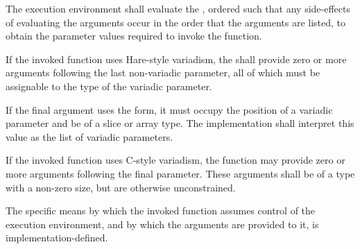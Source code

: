 \specsubsubitem
The execution environment shall evaluate the ,
ordered such that any side-effects of evaluating the arguments occur in the
order that the arguments are listed, to obtain the parameter values required to
invoke the function.

\specsubsubitem
If the invoked function uses Hare-style variadism, the
 shall provide zero or more arguments following the
last non-variadic parameter, all of which must be assignable to the type of the
variadic parameter.

\specsubsubitem
If the final argument uses the  form, it must occupy the position of a
variadic parameter and be of a slice or array type. The implementation shall
interpret this value as the list of variadic parameters.

\specsubsubitem
If the invoked function uses C-style variadism, the function may provide zero
or more arguments following the final parameter. These arguments shall be of a
type with a non-zero size, but are otherwise unconstrained.

\specsubsubitem
The specific means by which the invoked function assumes control of the
execution environment, and by which the arguments are provided to it, is
implementation-defined.



\begin{grammar}
 \\
	 \\
	 \\
	 \\
	 \\

 \\
	 \terminal{(}  \terminal{)} \\

 \\
	 \terminal{(}  \terminal{)} \\

 \\
	 \terminal{(}  \terminal{)} \\

 \\
	 \terminal{(}  \terminal{)} \\
\end{grammar}

